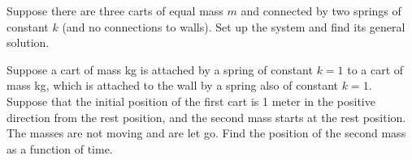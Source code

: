 \documentclass[12pt]{book}
\begin{document}
\begin{exercise}
Suppose there are three carts of equal mass $m$ and connected by two springs of
constant $k$ (and no connections to walls).  Set up the system and find its
general solution.
\end{exercise}

\begin{exercise}
Suppose a cart of mass \unit[2]{kg} is attached by a spring of
constant $k=1$ to a cart of mass \unit[3]{kg}, which
is attached to the wall by a spring also of constant $k=1$.
Suppose that the initial position of the first cart is 1 meter in the
positive direction from the rest position, and the second mass starts at the
rest position.  The masses are not moving and are let go.  Find the
position of the second mass as a function of time.
\end{exercise}
\end{document}
